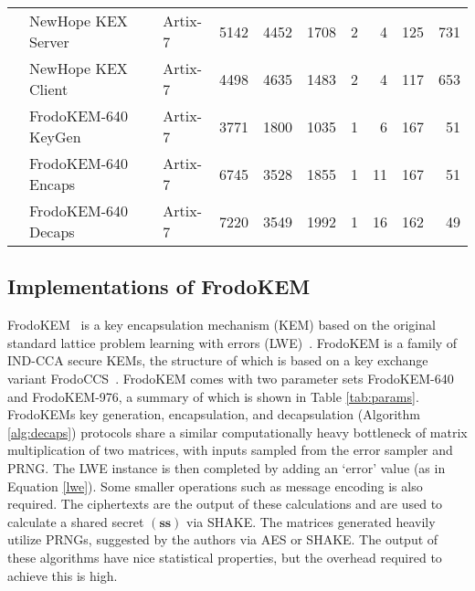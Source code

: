 \begin{table*}[tbhp]
\begin{center}
{\begin{tabular}{c l l N{5}{0} N{5}{0} N{5}{0} N{3}{0} N{3}{0} N{3}{0} N{5}{0}}
& \textsf{NewHope} KEX Server \cite{oder2017implementing}   & Artix-7   & 5142 & 4452 & 1708 & 2 & 4 & 125 & 731 \\
& \textsf{NewHope} KEX Client \cite{oder2017implementing}  & Artix-7   & 4498 & 4635 & 1483 & 2 & 4 & 117 & 653 \\  \Tstrut
& \textsf{FrodoKEM}-640 KeyGen \cite{howe2018standard} & Artix-7 & 3771 & 1800 & 1035 & 1 & 6 & 167 & 51 \\
& \textsf{FrodoKEM}-640 Encaps \cite{howe2018standard}  & Artix-7 & 6745 & 3528 & 1855 & 1 & 11 & 167 & 51 \\
& \textsf{FrodoKEM}-640 Decaps \cite{howe2018standard}  & Artix-7 & 7220 & 3549 & 1992 & 1 & 16 & 162 & 49 \\ \hline
\end{tabular}}%
\end{center}
\vspace{-0.2cm}
\end{table*}

\subsection{Implementations of FrodoKEM}

FrodoKEM~\cite{frodokem} is a key encapsulation mechanism (KEM) based on the original standard lattice problem learning with errors (LWE)~\cite{Regev05}. FrodoKEM is a family of IND-CCA secure KEMs, the structure of which is based on a key exchange variant FrodoCCS~\cite{frodoccs}. FrodoKEM comes with two parameter sets FrodoKEM-640 and FrodoKEM-976, a summary of which is shown in Table \ref{tab:params}. FrodoKEMs key generation, encapsulation, and decapsulation (Algorithm \ref{alg:decaps}) protocols share a similar computationally heavy bottleneck of matrix multiplication of two matrices, with inputs sampled from the error sampler and PRNG. The LWE instance is then completed by adding an `error' value (as in Equation \ref{lwe}). Some smaller operations such as message encoding is also required. The ciphertexts are the output of these calculations and are used to calculate a shared secret $(\mathbf{ss})$ via SHAKE. The matrices generated heavily utilize PRNGs, suggested by the authors via AES or SHAKE. The output of these algorithms have nice statistical properties, but the overhead required to achieve this is high.

